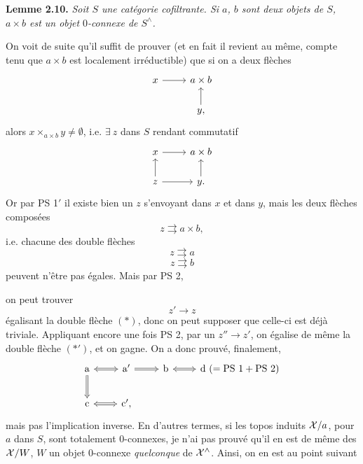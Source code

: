 \textbf{Lemme 2.10.} \textit{Soit $S$ une catégorie cofiltrante. Si $a$, $b$ sont deux objets de $S$, $a\times b$ est un objet} $0$\textit{-connexe de $S^\wedge$.}

On voit de suite qu'il suffit de prouver (et en fait il revient au même, compte tenu que $a\times b$ est localement irréductible) que si on a deux flèches
\[
\begin{tikzcd}
x \arrow[r] & a\times b \\
 & y, \arrow[u]
\end{tikzcd}
\]
alors $x\times_{a\times b}y\neq\emptyset$, i.e. $\exists\ z$ dans $S$ rendant commutatif
\[
\begin{tikzcd}
x \arrow[r] & a\times b \\
z \arrow[u] \arrow[r] & y. \arrow[u]
\end{tikzcd}
\]
Or par PS 1$'$ il existe bien un $z$ s'envoyant dans $x$ et dans $y$, mais les deux flèches composées
\[
z\rightrightarrows a\times b,
\]
i.e. chacune des double flèches
\[
z\rightrightarrows a \tag*{$(*)$}
\]
\[
z\rightrightarrows b \tag*{$(*')$}
\]
peuvent n'être pas égales. Mais par PS 2,

on peut trouver
\[
z'\longrightarrow z
\]
égalisant la double flèche $(*)$, donc on peut supposer que celle-ci est déjà triviale. Appliquant encore une fois PS 2, par un $z''\longrightarrow z'$, on égalise de même la double flèche $(*')$, et on gagne. On a donc prouvé, finalement,
\[
\begin{tikzcd}
\mathrm{a} \arrow[r, Leftrightarrow] \arrow[d, Rightarrow] & \mathrm{a}' \arrow[r, Rightarrow] & \mathrm{b} \arrow[r, Leftrightarrow] & \mathrm{d}\ (=\mathrm{PS}\ 1+\mathrm{PS}\ 2) \\
\mathrm{c} \arrow[r, Leftrightarrow] & \mathrm{c}',
\end{tikzcd}
\]
mais pas l'implication inverse. En d'autres termes, si les topos induits $\mathcal{X}/a$, pour $a$ dans $S$, sont totalement 0-connexes, je n'ai pas prouvé qu'il en est de même des $\mathcal{X}/W$, $W$ un objet 0-connexe \textit{quelconque} de $\mathcal{X}^\wedge$. Ainsi, on en est au point suivant

